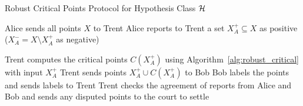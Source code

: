 \begin{algorithm2e}[htb]
\caption{Robust Critical Points Protocol for Hypothesis Class $\mathcal{H}$}
\label{alg:robust_abstract_critical_points_protocol}
\DontPrintSemicolon
\LinesNumbered



Alice sends all points $X$ to Trent\;
Alice reports to Trent a set $X_A^+ \subseteq X$ as positive ($X_A^- = X \setminus X_A^+$ as negative)\;


Trent computes the critical points $C(X_A^+)$ using Algorithm~\ref{alg:robust_critical} with input $X_A^+$\;
Trent sends points $X_A^+ \cup C(X_A^+)$ to Bob\;
Bob labels the points and sends labels to Trent\;
Trent checks the agreement of reports from Alice and Bob and sends any disputed points to the court to settle\;


\end{algorithm2e}
